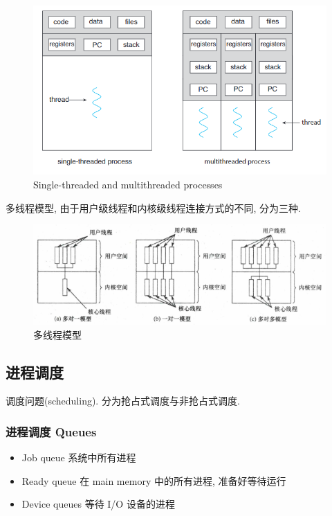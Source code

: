 \begin{figure}[H]
    \centering
    \includegraphics[width=0.618\linewidth]{pic/OS4/Single-threaded and multithreaded processes}
    \caption{Single-threaded and multithreaded processes}
\end{figure}

多线程模型, 由于用户级线程和内核级线程连接方式的不同, 分为三种. 

\begin{figure}[H]
    \centering
    \includegraphics[width=0.88\linewidth]{pic/OS-CheatSheet/多线程模型.png}
    \caption{多线程模型}
\end{figure}

\subsection{进程调度}
调度问题(scheduling). 分为抢占式调度与非抢占式调度. 

\subsubsection{进程调度 Queues}
\begin{itemize}\small
    \item Job queue
    \subitem 系统中所有进程
    \item Ready queue
    \subitem 在 main memory 中的所有进程, 准备好等待运行
    \item Device queues
    \subitem 等待 I/O 设备的进程
\end{itemize}

